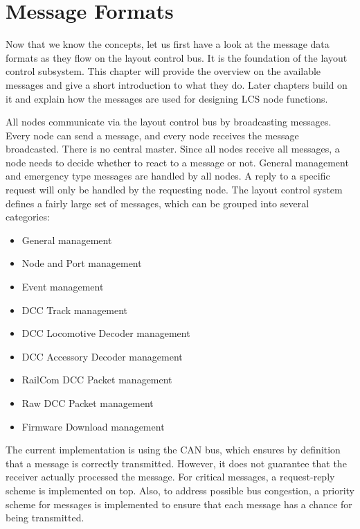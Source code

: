 \chapter{Message Formats}

Now that we know the concepts, let us first have a look at the message data formats as they flow on the layout control bus. It is the foundation of the layout control subsystem. This chapter will provide the overview on the available messages and give a short introduction to what they do. Later chapters build on it and explain how the messages are used for designing LCS node functions. 

All nodes communicate via the layout control bus by broadcasting messages. Every node can send a message, and every node receives the message broadcasted. There is no central master. Since all nodes receive all messages, a node needs to decide whether to react to a message or not. General management and emergency type messages are handled by all nodes. A reply to a specific request will only be handled by the requesting node. The layout control system defines a fairly large set of messages, which can be grouped into several categories:

\begin{itemize}
    \item General management
    \item Node and Port management
    \item Event management
    \item DCC Track management
    \item DCC Locomotive Decoder management
    \item DCC Accessory Decoder management
    \item RailCom DCC Packet management
    \item Raw DCC Packet management
    \item Firmware Download management
\end{itemize}

The current implementation is using the CAN bus, which ensures by definition that a message is correctly transmitted. However, it does not guarantee that the receiver actually processed the message. For critical messages, a request-reply scheme is implemented on top. Also, to address possible bus congestion, a priority scheme for messages is implemented to ensure that each message has a chance for being transmitted.


